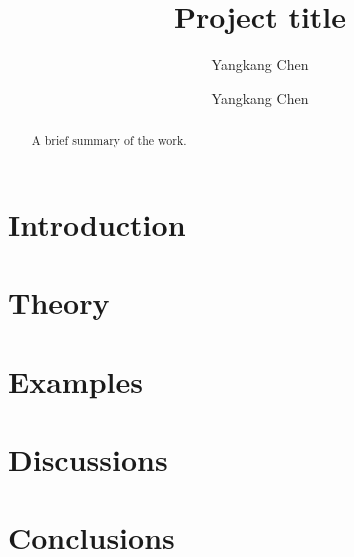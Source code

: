 

\title{Project title}
\author{Yangkang Chen}

\renewcommand{\thefootnote}{\fnsymbol{footnote}}

\author{Yangkang Chen\footnotemark[1]}


\address{
\footnotemark[1]
Previously: Bureau of Economic Geology \\
John A. and Katherine G. Jackson School of Geosciences \\
The University of Texas at Austin \\
University Station, Box X \\
Austin, TX 78713-8924 \\
ykchen@utexas.edu\\
Currently:National Center for Computational Sciences \\
Oak Ridge National Laboratory \\
One Bethel Valley Road, \\
Oak Ridge, TN 37831-6008\\
chenyk2016@gmail.com
}


\begin{abstract}
A brief summary of the work.
\end{abstract}


\section{Introduction}
\section{Theory}
\section{Examples}
\section{Discussions}
\section{Conclusions}
